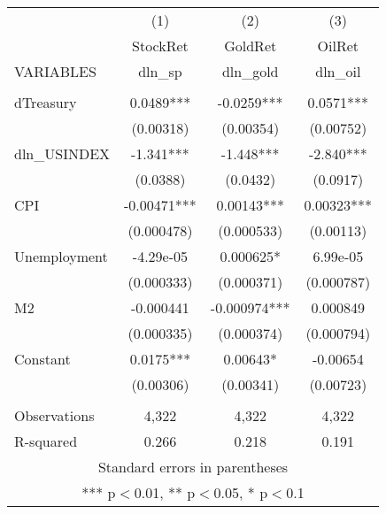 \documentclass[]{article}
\begin{document}
\begin{tabular}{lccc} \hline
 & (1) & (2) & (3) \\
 & StockRet & GoldRet & OilRet \\
VARIABLES & dln\_sp & dln\_gold & dln\_oil \\ \hline
 &  &  &  \\
dTreasury & 0.0489*** & -0.0259*** & 0.0571*** \\
 & (0.00318) & (0.00354) & (0.00752) \\
dln\_USINDEX & -1.341*** & -1.448*** & -2.840*** \\
 & (0.0388) & (0.0432) & (0.0917) \\
CPI & -0.00471*** & 0.00143*** & 0.00323*** \\
 & (0.000478) & (0.000533) & (0.00113) \\
Unemployment & -4.29e-05 & 0.000625* & 6.99e-05 \\
 & (0.000333) & (0.000371) & (0.000787) \\
M2 & -0.000441 & -0.000974*** & 0.000849 \\
 & (0.000335) & (0.000374) & (0.000794) \\
Constant & 0.0175*** & 0.00643* & -0.00654 \\
 & (0.00306) & (0.00341) & (0.00723) \\
 &  &  &  \\
Observations & 4,322 & 4,322 & 4,322 \\
 R-squared & 0.266 & 0.218 & 0.191 \\ \hline
\multicolumn{4}{c}{ Standard errors in parentheses} \\
\multicolumn{4}{c}{ *** p$<$0.01, ** p$<$0.05, * p$<$0.1} \\
\end{tabular}
\end{document}
